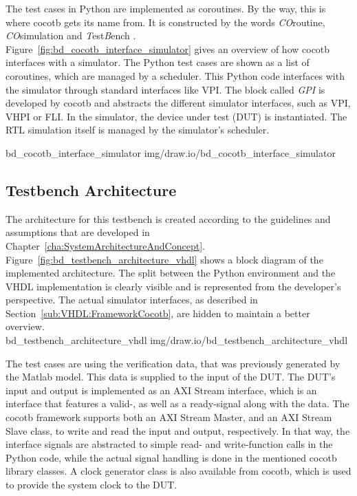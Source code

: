 The test cases in Python are implemented as coroutines.
By the way, this is where cocotb gets its name from.
It is constructed by the words \textit{CO}routine, \textit{CO}simulation and \textit{T}est\textit{B}ench \cite{cocotbDoc}.\\

Figure~\ref{fig:bd_cocotb_interface_simulator} gives an overview of how cocotb interfaces with a simulator.
The Python test cases are shown as a list of coroutines, which are managed by a scheduler.
This Python code interfaces with the simulator through standard interfaces like VPI.
The block called \textit{GPI} is developed by cocotb and abstracts the different simulator interfaces, such as VPI, VHPI or FLI.
In the simulator, the device under test (DUT) is instantiated.
The RTL simulation itself is managed by the simulator's scheduler.

 {bd_cocotb_interface_simulator} {img/draw.io/bd_cocotb_interface_simulator}

\subsection{Testbench Architecture}
\label{sub:VHDL:TestbenchArchitecture}

The architecture for this testbench is created according to the guidelines and assumptions that are developed in Chapter~\ref{cha:SystemArchitectureAndConcept}.\\

Figure~\ref{fig:bd_testbench_architecture_vhdl} shows a block diagram of the implemented architecture.
The split between the Python environment and the VHDL implementation is clearly visible and is represented from the developer's perspective.
The actual simulator interfaces, as described in Section~\ref{sub:VHDL:FrameworkCocotb}, are hidden to maintain a better overview.\\

 {bd_testbench_architecture_vhdl} {img/draw.io/bd_testbench_architecture_vhdl}

The test cases are using the verification data, that was previously generated by the Matlab model.
This data is supplied to the input of the DUT.
The DUT's input and output is implemented as an AXI Stream interface, which is an interface that features a valid-, as well as a ready-signal along with the data.
The cocotb framework supports both an AXI Stream Master, and an AXI Stream Slave class, to write and read the input and output, respectively.
In that way, the interface signals are abstracted to simple read- and write-function calls in the Python code, while the actual signal handling is done in the mentioned cocotb library classes.
A clock generator class is also available from cocotb, which is used to provide the system clock to the DUT.\\

